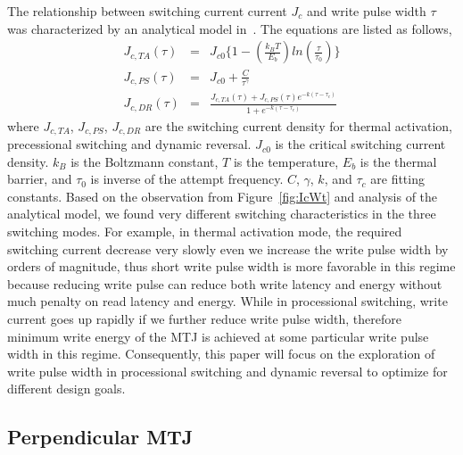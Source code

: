 The relationship between switching current current $J_{c}$ and write pulse width $\tau$ was characterized by an analytical model in~\cite{STTRAM:IEDM09}. The equations are listed as follows,
\begin{eqnarray}
J_{c,TA}(\tau) &=& J_{c0}\{1- (\frac{k_{B}T}{E_{b}})ln(\frac{\tau}{\tau_{0}})\} \label{eqn:jcta} \\
J_{c,PS}(\tau) &=& J_{c0}+ \frac{C}{\tau^{\gamma}} \label{eqn:jcps} \\
J_{c,DR}(\tau) &=& \frac{J_{c,TA}(\tau)+J_{c,PS}(\tau)e^{-k(\tau - \tau_{c})}}{1+e^{-k(\tau - \tau_{c})}} \label{eqn:jcdr} 
\end{eqnarray}  
where $J_{c,TA}$, $J_{c,PS}$, $J_{c,DR}$ are the switching current density for thermal activation, precessional switching and dynamic reversal. $J_{c0}$ is the critical switching current density. $k_{B}$ is the Boltzmann constant, $T$ is the temperature, $E_{b}$ is the thermal barrier, and $\tau_{0}$ is inverse of the attempt frequency. $C$, $\gamma$, $k$, and $\tau_{c}$ are fitting constants. Based on the observation from Figure~\ref{fig:IcWt} and analysis of the analytical model,  we found very different switching characteristics in the three switching modes. For example, in thermal activation mode, the required switching current decrease very slowly even we increase the write pulse width by orders of magnitude, thus short write pulse width is more favorable in this regime because reducing write pulse can reduce both write latency and energy without much penalty on read latency and energy. While in processional switching, write current goes up rapidly if we further reduce write pulse width, therefore minimum write energy of the MTJ is achieved at some particular write pulse width in this regime. Consequently, this paper will focus on the exploration of write pulse width in processional switching and dynamic reversal to optimize for different design goals.

\subsection{Perpendicular MTJ}
